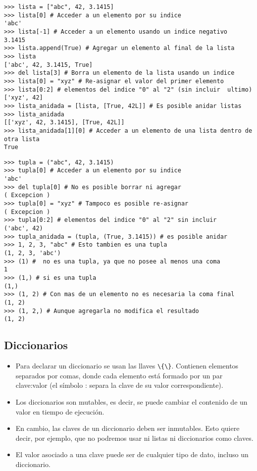 \documentclass{article}
\begin{document}
\begin{lstlisting}
>>> lista = ["abc", 42, 3.1415]
>>> lista[0] # Acceder a un elemento por su indice
'abc'
>>> lista[-1] # Acceder a un elemento usando un indice negativo
3.1415
>>> lista.append(True) # Agregar un elemento al final de la lista
>>> lista
['abc', 42, 3.1415, True]
>>> del lista[3] # Borra un elemento de la lista usando un indice
>>> lista[0] = "xyz" # Re-asignar el valor del primer elemento
>>> lista[0:2] # elementos del indice "0" al "2" (sin incluir  ultimo)
['xyz', 42]
>>> lista_anidada = [lista, [True, 42L]] # Es posible anidar listas
>>> lista_anidada
[['xyz', 42, 3.1415], [True, 42L]]
>>> lista_anidada[1][0] # Acceder a un elemento de una lista dentro de otra lista
True
\end{lstlisting}

\begin{lstlisting}
>>> tupla = ("abc", 42, 3.1415)
>>> tupla[0] # Acceder a un elemento por su indice
'abc'
>>> del tupla[0] # No es posible borrar ni agregar
( Excepcion )
>>> tupla[0] = "xyz" # Tampoco es posible re-asignar
( Excepcion )
>>> tupla[0:2] # elementos del indice "0" al "2" sin incluir
('abc', 42)
>>> tupla_anidada = (tupla, (True, 3.1415)) # es posible anidar
>>> 1, 2, 3, "abc" # Esto tambien es una tupla
(1, 2, 3, 'abc')
>>> (1) #  no es una tupla, ya que no posee al menos una coma
1
>>> (1,) # si es una tupla
(1,)
>>> (1, 2) # Con mas de un elemento no es necesaria la coma final
(1, 2)
>>> (1, 2,) # Aunque agregarla no modifica el resultado
(1, 2)
\end{lstlisting}

\subsection{Diccionarios}
\begin{itemize}
\item    Para declarar un diccionario se usan las llaves \verb~\{\}~. Contienen elementos separados por comas, donde cada elemento está formado por un par clave:valor (el símbolo : separa la clave de su valor correspondiente).
 \item   Los diccionarios son mutables, es decir, se puede cambiar el contenido de un valor en tiempo de ejecución.
\item    En cambio, las claves de un diccionario deben ser inmutables. Esto quiere decir, por ejemplo, que no podremos usar ni listas ni diccionarios como claves.
\item    El valor asociado a una clave puede ser de cualquier tipo de dato, incluso un diccionario.

\end{itemize}
\end{document}
